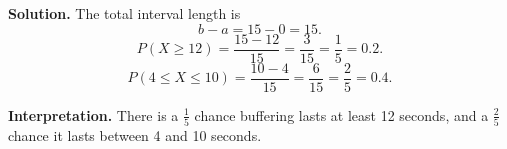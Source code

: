 \begin{ExamProblems}
\textbf{Solution.}
The total interval length is
\[
b-a=15-0=15.
\]
\[
P(X\ge 12)=\frac{15-12}{15}=\frac{3}{15}=\frac{1}{5}=0.2.
\]
\[
P(4\le X\le 10)=\frac{10-4}{15}=\frac{6}{15}=\frac{2}{5}=0.4.
\]

\textbf{Interpretation.}
There is a $\frac{1}{5}$ chance buffering lasts at least 12 seconds, and a $\frac{2}{5}$ chance it lasts between 4 and 10 seconds.

\end{ExamProblems}

